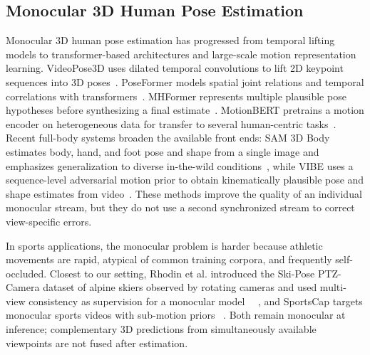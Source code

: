 \documentclass[preprint,12pt]{elsarticle}
\providecommand{\DIFaddbegin}{} %
\providecommand{\DIFaddend}{} %
\providecommand{\DIFadd}[1]{{\protect\color{blue}#1}} %
\begin{document}
\subsection{Monocular  3D Human Pose Estimation}
Monocular 3D human pose estimation has progressed from temporal lifting models to transformer-based architectures and large-scale motion representation learning. VideoPose3D uses dilated temporal convolutions to lift 2D keypoint sequences into 3D poses~\cite{pavllo2019videopose3d}. PoseFormer models spatial joint relations and temporal correlations with transformers~\cite{zheng2021poseformer}. MHFormer represents multiple plausible pose hypotheses before synthesizing a final estimate~\cite{li2022mhformer}. MotionBERT pretrains a motion encoder on heterogeneous data for transfer to several human-centric tasks~\cite{zhu2023motionbert}. Recent full-body systems broaden the available front ends: SAM 3D Body estimates body, hand, and foot pose and shape from a single image and emphasizes generalization to diverse in-the-wild conditions~\cite{yang2026sam}, while VIBE uses a sequence-level adversarial motion prior to obtain kinematically plausible pose and shape estimates from video~\cite{kocabas2020vibe}. These methods improve the quality of an individual monocular stream, but they do not use a second synchronized stream to correct view-specific errors.

 \DIFaddbegin \DIFadd{In sports applications, }\DIFaddend the monocular problem  \DIFaddbegin \DIFadd{is harder because athletic }\DIFaddend movements are rapid, atypical of common training corpora, and frequently self-occluded. \DIFaddbegin \DIFadd{Closest to our setting, }\DIFaddend Rhodin et al. introduced  \DIFaddbegin \DIFadd{the Ski-Pose PTZ-Camera dataset of alpine skiers observed by }\DIFaddend rotating cameras and  used multi-view consistency  as supervision for a  \DIFaddbegin \DIFadd{monocular model~\mbox{%
\cite{rhodin2018learning}}\hskip0pt%
, and SportsCap }\DIFaddend targets monocular sports videos  \DIFaddbegin \DIFadd{with }\DIFaddend sub-motion priors ~\cite{chen2021sportscap}.  \DIFaddbegin \DIFadd{Both remain monocular at inference}\DIFaddend ; complementary 3D predictions from simultaneously available viewpoints are not fused after estimation.
\end{document}
